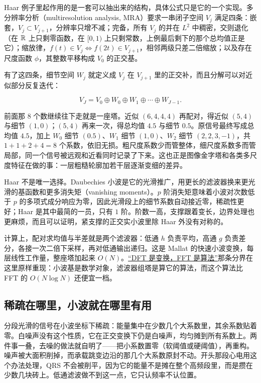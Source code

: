 Haar 例子里起作用的是一套可以抽出来的结构，具体公式只是它的一个实现。多分辨率分析（multiresolution analysis, MRA）要求一串闭子空间 \(V_j\) 满足四条：嵌套，\(V_j\subset V_{j+1}\)，分辨率只增不减；完备，所有 \(V_j\) 的并在 \(L^2\) 中稠密，交则退化（在 \(\mathbb{R}\) 上只剩零函数，在 \([0,1)\) 上只剩常数，上例最后剩下的那个总均值正是它）；缩放律，\(f(t)\in V_j\iff f(2t)\in V_{j+1}\)，相邻两级只差二倍缩放；以及存在尺度函数 \(\phi\)，其整数平移构成 \(V_0\) 的正交基。

有了这四条，细节空间 \(W_j\) 就定义成 \(V_j\) 在 \(V_{j+1}\) 里的正交补，而且分解可以对近似部分反复迭代：

\[
V_J=V_0\oplus W_0\oplus W_1\oplus\cdots\oplus W_{J-1}.
\]

前面那 8 个数继续往下走就是一座塔。近似 \((6,4,4,4)\) 再配对，得近似 \((5,4)\) 与细节 \((1,0)\)；\((5,4)\) 再来一次，得总均值 \(4.5\) 与细节 \(0.5\)。原信号最终写成总均值 \(4.5\)，加上 \(W_0\) 细节 \((0.5)\)、\(W_1\) 细节 \((1,0)\)、\(W_2\) 细节 \((2,2,3,-1)\)，共 \(1+1+2+4=8\) 个系数，依旧无损。粗尺度系数少而管整体，细尺度系数多而管局部，同一个信号被远观和近看同时记录了下来。这也正是图像金字塔和各类多尺度特征在做的事：一层粗糙轮廓加若干层逐渐变细的差异。

Haar 不是唯一选择。Daubechies 小波是它的光滑推广，用更长的滤波器换来更光滑的基函数和更多消失矩（vanishing moments）。\(p\) 阶消失矩意味着小波对次数低于 \(p\) 的多项式成分响应为零，因此光滑段上的细节系数自动接近零，稀疏性更好；Haar 是其中最简的一员，只有 \(1\) 阶。阶数一高，支撑跟着变长，边界处理也更麻烦，而且可以证明，紧支撑的正交实小波里除 Haar 外没有对称的。

计算上，配对求均值与半差就是两个滤波器：低通 \(h\) 负责平均，高通 \(g\) 负责差分，各接一次二倍下采样，再对低通输出递归。这是 Mallat 的快速小波变换，每层线性工作量，整座塔加起来 \(O(N)\)。\hyperref[sec:08-Numerical-Analysis/08-Fourier-and-Spectral-Methods/03]{``DFT 是变换，FFT 是算法''}那条分界在这里原样重现：小波基是数学对象，滤波器组塔是算它的算法，而这个算法比 FFT 的 \(O(N\log N)\) 还便宜一档。

\subsection{稀疏在哪里，小波就在哪里有用}

分段光滑的信号在小波坐标下稀疏：能量集中在少数几个大系数里，其余系数贴着零。白噪声没有这个性质，它在正交变换下仍是白噪声，均匀摊到所有系数上。两件事一叠，去噪的做法就自明了——把小系数置零（软阈值或硬阈值），再重构。噪声被大面积削掉，而承载跳变边沿的那几个大系数原封不动。开头那段心电用这个办法处理，QRS 不会被削平，因为它的能量不是摊在整个高频段里，而是攒在少数几块砖上。低通滤波做不到这一点，它只认频率不认位置。


